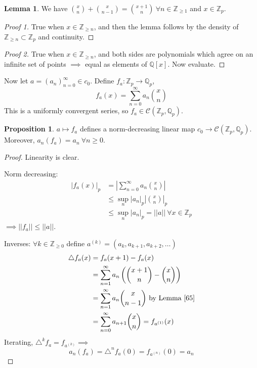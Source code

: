 \documentclass[a4paper]{article}
\theoremstyle{definition}
\theoremstyle{default}
\newtheorem{lemma}[definition]{Lemma}
\newtheorem{prop}[definition]{Proposition}
\theoremstyle{remark}
\newcommand*\abs[1]{\left|#1\right|}
\newcommand*\norm[1]{\abs{\abs{#1}}}
\begin{document}
\begin{lemma}
	We have
	${x \choose n} + {x \choose n-1} = {x+1 \choose n}\ \forall n \in \mathbb{Z}_{\geq 1}$
	and $x \in \mathbb{Z}_p$.
	\label{65}
\end{lemma}
\begin{proof}[Proof 1]
	True when $x \in \mathbb{Z}_{\geq n}$,
	and then the lemma follows by the density of $\mathbb{Z}_{\geq n} \subset \mathbb{Z}_p$ and continuity.
\end{proof}
\begin{proof}[Proof 2]
	True when $x \in \mathbb{Z}_{\geq n}$,
	and both sides are polynomials which agree on an infinite set of points $\implies$ equal as elements of $\mathbb{Q}[x]$.
	Now evaluate.
\end{proof}

Now let $a = (a_n)_{n=0}^\infty \in c_0$. 
Define $f_a: \mathbb{Z}_p \to \mathbb{Q}_p$,
$$f_a(x) = \sum_{n=0}^\infty a_n {x \choose n}$$
This is a uniformly convergent series,
so $f_a \in \mathcal{C}(\mathbb{Z}_p, \mathbb{Q}_p)$.

\begin{prop}
	$a \mapsto f_a$ defines a norm-decreasing linear map $c_0 \to \mathcal{C}(\mathbb{Z}_p, \mathbb{Q}_p)$.
	Moreover, $a_n(f_a) = a_n\ \forall n \geq 0$.
\end{prop}
\begin{proof}
	Linearity is clear.
	
	Norm decreasing:
	\begin{align*}
		\abs{f_a(x)}_p &= \abs{\sum_{n=0}^\infty a_n {x \choose n}} \\
		&\leq \sup_n \abs{a_n}_p \abs{{x \choose n}}_p \\
		&\leq \sup_n \abs{a_n}_p = \norm{a}\ \forall x \in \mathbb{Z}_p
	\end{align*}
	$\implies \norm{f_a} \leq \norm{a}$.
	
	Inverses: $\forall k \in \mathbb{Z}_{\geq 0}$ define $a^{(k)}=(a_k, a_{k+1}, a_{k+2}, \dots)$
	\begin{align*}
		\triangle f_a(x) &= f_a(x+1)-f_a(x) \\
		&= \sum_{n=1}^\infty a_n\left({x+1 \choose n} - {x \choose n}\right) \\
		&= \sum_{n=1}^\infty a_n {x \choose n-1} \text{ by Lemma \ref{65}} \\
		&= \sum_{n=0}^\infty a_{n+1}{x \choose n} = f_{a^{(1)}}(x)
	\end{align*}
	Iterating, $\triangle^k f_a = f_{a^{(k)}} \implies$
	$$a_n(f_a) = \triangle^n f_a(0) = f_{a^{(n)}}(0) = a_n$$
\end{proof}
\end{document}
